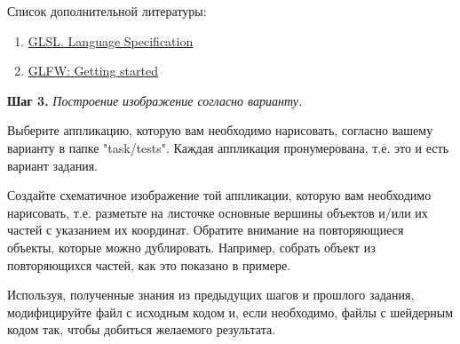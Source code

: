 \documentclass[a4paper,12pt]{article}
\theoremstyle{plain}
\begin{document}
    Список дополнительной литературы:
    
    \begin{enumerate}

    \item 
    \href{https://www.khronos.org/registry/OpenGL/specs/gl/}{GLSL. Language Specification}
    
    \item
    \href{https://www.glfw.org/docs/latest/quick.html}{GLFW: Getting started}

    \end{enumerate}
    
    
    \textbf{Шаг 3.} \textit{Построение изображение согласно варианту.}
    
    Выберите аппликацию, которую вам необходимо нарисовать, согласно вашему варианту в папке "task/tests". Каждая аппликация пронумерована, т.е. это и есть вариант задания.
    
    Создайте схематичное изображение той аппликации, которую вам необходимо нарисовать, т.е. разметьте на листочке основные вершины объектов и/или их частей с указанием их координат. Обратите внимание на повторяющиеся объекты, которые можно дублировать. Например, собрать объект из повторяющихся частей, как это показано в примере.
    
    Используя, полученные знания из предыдущих шагов и прошлого задания, модифицируйте файл с исходным кодом и, если необходимо, файлы с шейдерным кодом так, чтобы добиться желаемого результата.
\end{document}

